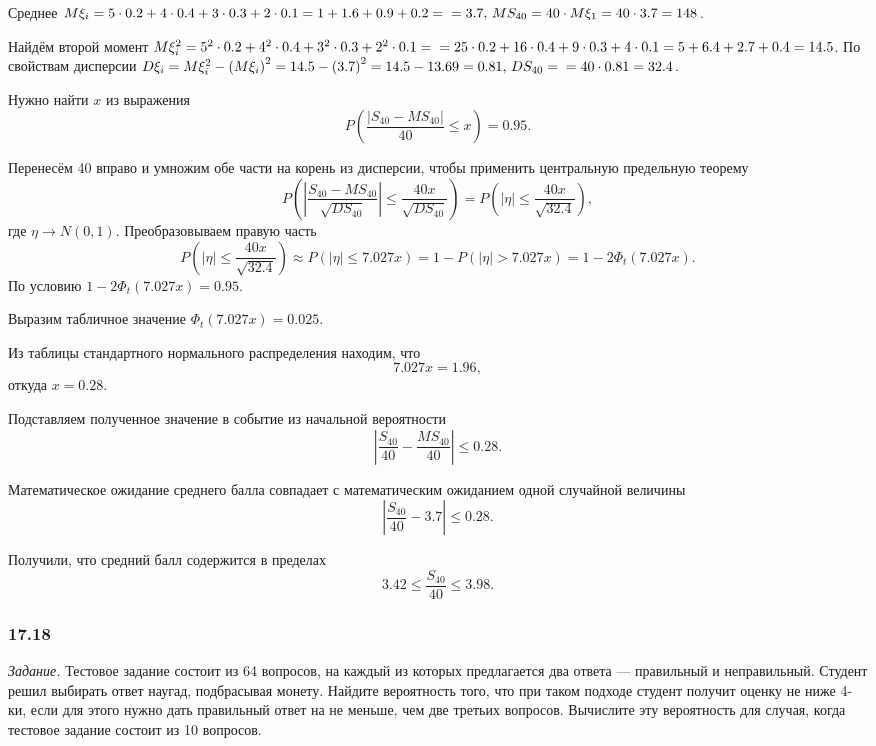 Среднее
$M \xi_i = 5 \cdot 0.2 + 4 \cdot 0.4 + 3 \cdot 0.3 + 2 \cdot 0.1 = 1 + 1.6 + 0.9 + 0.2 = \\
  = 3.7, \,
  MS_{40} = 40 \cdot M \xi_1 = 40 \cdot 3.7 = 148$.

Найдём второй момент
$M \xi_i^2 =
  5^2 \cdot 0.2 + 4^2 \cdot 0.4 + 3^2 \cdot 0.3 + 2^2 \cdot 0.1 = \\
  = 25 \cdot 0.2 + 16 \cdot 0.4 + 9 \cdot 0.3 + 4 \cdot 0.1 =
  5 + 6.4 + 2.7 + 0.4 =
  14.5$.
По свойствам дисперсии
$D \xi_i =
  M \xi_i^2 - \left( M \xi_i \right)^2 =
  14.5 - \left( 3.7 \right)^2 =
  14.5 - 13.69 =
  0.81, \,
  DS_{40} = \\
  = 40 \cdot 0.81 = 32.4$.

Нужно найти $x$ из выражения
$$P \left( \frac{ \left| S_{40} - MS_{40} \right| }{40} \leq x \right) =
  0.95.$$

Перенесём 40 вправо и умножим обе части на корень из дисперсии,
чтобы применить центральную предельную теорему
$$P \left(
    \left| \frac{S_{40} - MS_{40}}{ \sqrt{DS_{40}}} \right| \leq \frac{40x}{ \sqrt{DS_{40}}}
  \right) =
  P \left( \left| \eta \right| \leq \frac{40x}{ \sqrt{32.4}} \right),$$
где $ \eta \to N \left( 0, 1 \right) $.
Преобразовываем правую часть
$$P \left( \left| \eta \right| \leq \frac{40x}{ \sqrt{32.4}} \right) \approx
  P \left( \left| \eta \right| \leq 7.027x \right) =
  1 - P \left( \left| \eta \right| > 7.027x \right) =
  1 - 2 \Phi_t \left( 7.027x \right).$$
По условию $1 - 2 \Phi_t \left( 7.027x \right) = 0.95$.

Выразим табличное значение $ \Phi_t \left( 7.027x \right) = 0.025$.

Из таблицы стандартного нормального распределения находим, что
$$7.027x =
  1.96,$$
откуда $x = 0.28$.

Подставляем полученное значение в событие из начальной вероятности
$$ \left| \frac{S_{40}}{40} - \frac{MS_{40}}{40} \right| \leq
  0.28.$$

Математическое ожидание среднего балла совпадает с математическим ожиданием
одной случайной величины
$$ \left| \frac{S_{40}}{40} - 3.7 \right| \leq
  0.28.$$

Получили, что средний балл содержится в пределах
$$3.42 \leq
  \frac{S_{40}}{40} \leq
  3.98.$$

\subsubsection*{17.18}

\textit{Задание.}
Тестовое задание состоит из 64 вопросов, на каждый из которых предлагается два ответа ---
правильный и неправильный.
Студент решил выбирать ответ наугад, подбрасывая монету.
Найдите вероятность того, что при таком подходе студент получит оценку не ниже 4-ки,
если для этого нужно дать правильный ответ на не меньше, чем две третьих вопросов.
Вычислите эту вероятность для случая, когда тестовое задание состоит из 10 вопросов.

